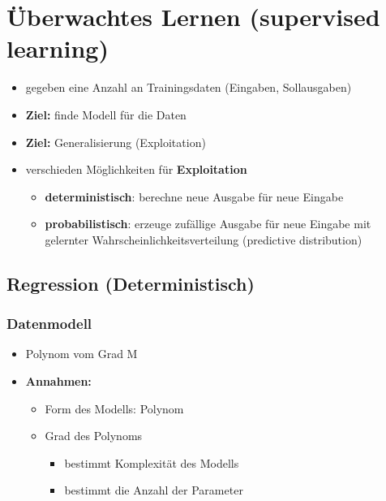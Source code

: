 \section{Überwachtes Lernen (supervised learning)}
	\begin{itemize}
		\item gegeben eine Anzahl an Trainingsdaten (Eingaben, Sollausgaben)
		\item \textbf{Ziel:} finde Modell für die Daten
		\item \textbf{Ziel:} Generalisierung (Exploitation)
		\item verschieden Möglichkeiten für \textbf{Exploitation}
		\begin{itemize}
			\item \textbf{deterministisch}: berechne neue Ausgabe für neue Eingabe
			\item \textbf{probabilistisch}: erzeuge zufällige Ausgabe für neue Eingabe mit gelernter Wahrscheinlichkeitsverteilung (predictive distribution)
		\end{itemize}
	\end{itemize}
	\subsection{Regression (Deterministisch)}
	\subsubsection{Datenmodell}
	\begin{itemize}
		\item Polynom vom Grad M
		\item \textbf{Annahmen:}
		\vspace*{-3pt}
		\begin{itemize}[$\hookrightarrow$]
			\item Form des Modells: Polynom
			\item Grad des Polynoms
			\begin{itemize}[$\hookrightarrow$]
				\item bestimmt Komplexität des Modells
				\item bestimmt die Anzahl der Parameter
			\end{itemize}
		\end{itemize}
	\end{itemize}
